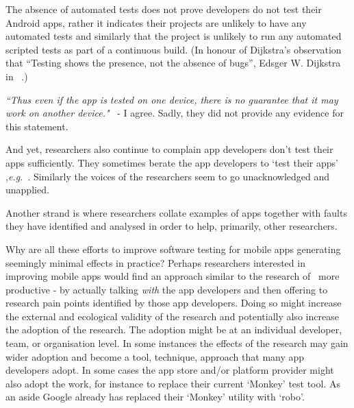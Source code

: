 The absence of automated tests does not prove developers do not test their Android apps, rather it indicates their projects are unlikely to have any automated tests and similarly that the project is unlikely to run any automated scripted tests as part of a continuous build. (In honour of Dijkstra's observation that ``Testing shows the presence, not the absence of bugs'', Edsger W. Dijkstra in ~.) %



\emph{``Thus even if the app is tested on one device, there is no guarantee that it may work on another device."}~ - I agree. Sadly, they did not provide any evidence for this statement.

And yet, researchers also continue to complain app developers don't test their apps sufficiently. They sometimes berate the app developers to `test their apps' ,\emph{e.g.}~.
Similarly the voices of the researchers seem to go unacknowledged and unapplied.

Another strand is where researchers collate examples of apps together with faults they have identified and analysed in order to help, primarily, other researchers. 

Why are all these efforts to improve software testing for mobile apps generating seemingly minimal effects in practice? Perhaps researchers interested in improving mobile apps would find an approach similar to the research of~ more productive - by actually talking \emph{with} the app developers and then offering to research pain points identified by those app developers. Doing so might increase the external and ecological validity of the research and potentially also increase the adoption of the research. The adoption might be at an individual developer, team, or organisation level. In some instances the effects of the research may gain wider adoption and become a tool, technique, approach that many app developers adopt. In some cases the app store and/or platform provider might also adopt the work, for instance to replace their current `Monkey' test tool. As an aside Google already has replaced their `Monkey' utility with `robo'.

